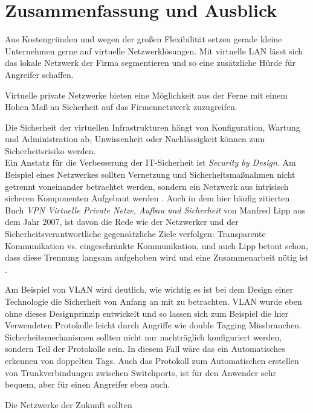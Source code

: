 \chapter{Zusammenfassung und Ausblick}

Aus Kostengründen und wegen der großen Flexibilität setzen gerade kleine Unternehmen gerne auf virtuelle Netzwerklösungen. Mit virtuelle LAN lässt sich das lokale Netzwerk der Firma segmentieren und so eine zusätzliche Hürde für Angreifer schaffen.

Virtuelle private Netzwerke bieten eine Möglichkeit aus der Ferne mit einem Hohen Maß an Sicherheit auf das Firmennetzwerk zuzugreifen. 

Die Sicherheit der virtuellen Infrastrukturen hängt von Konfiguration, Wartung und Administration ab, Unwissenheit oder Nachlässigkeit können zum Sicherheitsrisiko werden. \\   

Ein Anstatz für die Verbesserung der IT-Sicherheit ist \emph{Security by Design}. Am Beispiel eines Netzwerkes sollten Vernetzung und Sicherheitsmaßnahmen nicht getrennt voneinander betrachtet werden, sondern ein Netzwerk aus intrisisch sicheren Komponenten Aufgebaut werden \cite{nicholson2018blurring}. Auch in dem hier häufig zitierten Buch \emph{VPN Virtuelle Private Netze, Aufbau und Sicherheit} von Manfred Lipp aus dem Jahr 2007, ist davon die Rede wie der Netzwerker und der Sicherheitsverantwortliche gegensätzliche Ziele verfolgen: Transparente Kommunikation vs. eingeschränkte Kommunikation, und auch Lipp betont schon, dass diese Trennung langsam aufgehoben wird und eine Zusammenarbeit nötig ist \cite{lipp2007vpn}. 

Am Beispiel von VLAN wird deutlich, wie wichtig es ist bei dem Design einer Technologie die Sicherheit von Anfang an mit zu betrachten. VLAN wurde eben ohne dieses Designprinzip entwickelt und so lassen sich zum Beispiel die hier Verwendeten Protokolle leicht durch Angriffe wie double Tagging Missbrauchen. Sicherheitsmechanismen sollten nicht nur nachträglich konfiguriert werden, sondern Teil der Protokolle sein. In diesem Fall wäre das ein Automatisches erkennen von doppelten Tags. Auch das Protokoll zum Automatischen erstellen von Trunkverbindungen zwischen Switchports, ist für den Anwender sehr bequem, aber für einen Angreifer eben auch. 

Die Netzwerke der Zukunft sollten 